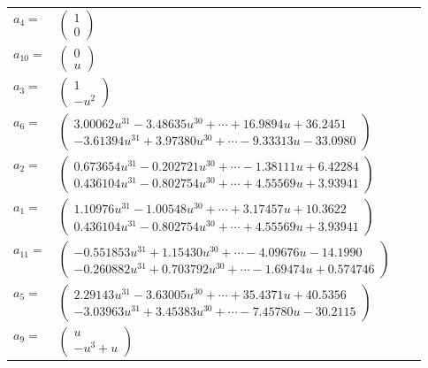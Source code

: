 \documentclass[1p]{elsarticle_modified}
\theoremstyle{definition}
\begin{document}
\begin{tabular}{m{7pt} m{180pt} m{7pt} m{180pt} }
\flushright $a_{4}=$&$\begin{pmatrix}1\\0\end{pmatrix}$ \\
\flushright $a_{10}=$&$\begin{pmatrix}0\\u\end{pmatrix}$ \\
\flushright $a_{3}=$&$\begin{pmatrix}1\\- u^2\end{pmatrix}$ \\
\flushright $a_{6}=$&$\begin{pmatrix}3.00062 u^{31}-3.48635 u^{30}+\cdots+16.9894 u+36.2451\\-3.61394 u^{31}+3.97380 u^{30}+\cdots-9.33313 u-33.0980\end{pmatrix}$ \\
\flushright $a_{2}=$&$\begin{pmatrix}0.673654 u^{31}-0.202721 u^{30}+\cdots-1.38111 u+6.42284\\0.436104 u^{31}-0.802754 u^{30}+\cdots+4.55569 u+3.93941\end{pmatrix}$ \\
\flushright $a_{1}=$&$\begin{pmatrix}1.10976 u^{31}-1.00548 u^{30}+\cdots+3.17457 u+10.3622\\0.436104 u^{31}-0.802754 u^{30}+\cdots+4.55569 u+3.93941\end{pmatrix}$ \\
\flushright $a_{11}=$&$\begin{pmatrix}-0.551853 u^{31}+1.15430 u^{30}+\cdots-4.09676 u-14.1990\\-0.260882 u^{31}+0.703792 u^{30}+\cdots-1.69474 u+0.574746\end{pmatrix}$ \\
\flushright $a_{5}=$&$\begin{pmatrix}2.29143 u^{31}-3.63005 u^{30}+\cdots+35.4371 u+40.5356\\-3.03963 u^{31}+3.45383 u^{30}+\cdots-7.45780 u-30.2115\end{pmatrix}$ \\
\flushright $a_{9}=$&$\begin{pmatrix}u\\- u^3+u\end{pmatrix}$ \\

\end{tabular}
\end{document}
